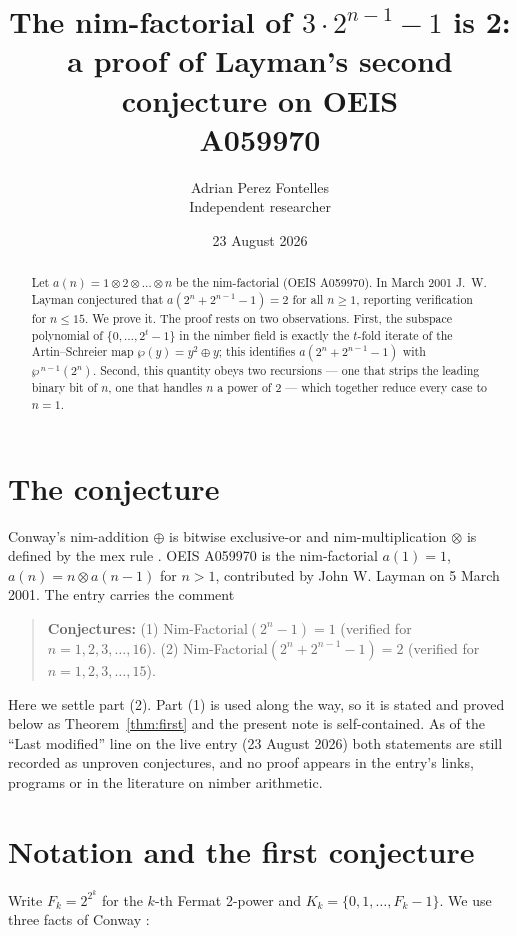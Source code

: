 \documentclass[11pt,a4paper]{article}
\title{The nim-factorial of $3\cdot2^{n-1}-1$ is 2:\\
a proof of Layman's second conjecture on OEIS\\
A059970}
\author{Adrian Perez Fontelles\\ \small Independent researcher}
\date{23 August 2026}
\theoremstyle{plain}
\theoremstyle{definition}
\begin{document}
\maketitle

\begin{abstract}
Let $a(n)=1\otimes2\otimes\dots\otimes n$ be the nim-factorial (OEIS A059970). In March
2001 J.~W. Layman conjectured that $a(2^{n}+2^{n-1}-1)=2$ for all $n\ge1$, reporting
verification for $n\le15$. We prove it. The proof rests on two observations. First, the
subspace polynomial of $\{0,\dots,2^{t}-1\}$ in the nimber field is exactly the $t$-fold
iterate of the Artin--Schreier map $\wp(y)=y^{2}\oplus y$; this identifies
$a(2^{n}+2^{n-1}-1)$ with $\wp^{\,n-1}(2^{n})$. Second, this quantity obeys two recursions
--- one that strips the leading binary bit of $n$, one that handles $n$ a power of 2 ---
which together reduce every case to $n=1$.
\end{abstract}

\section{The conjecture}

Conway's nim-addition $\oplus$ is bitwise exclusive-or and nim-multiplication $\otimes$ is
defined by the mex rule \cite[Ch.~6]{conway}. OEIS A059970 is the nim-factorial $a(1)=1$,
$a(n)=n\otimes a(n-1)$ for $n>1$, contributed by John W. Layman on 5 March 2001. The entry
carries the comment

\begin{quote}
\textbf{Conjectures:} (1) Nim-Factorial$(2^{n}-1)=1$ (verified for $n=1,2,3,\dots,16$).
(2) Nim-Factorial$(2^{n}+2^{n-1}-1)=2$ (verified for $n=1,2,3,\dots,15$).
\end{quote}

Here we settle part (2). Part (1) is used along the way, so it is stated and proved below
as Theorem~\ref{thm:first} and the present note is self-contained. As of the ``Last
modified'' line on the live entry (23 August 2026) both statements are still recorded as
unproven conjectures, and no proof appears in the entry's links, programs or in the
literature on nimber arithmetic.

\section{Notation and the first conjecture}

Write $F_{k}=2^{2^{k}}$ for the $k$-th Fermat 2-power and $K_{k}=\{0,1,\dots,F_{k}-1\}$. We
use three facts of Conway \cite[Ch.~6]{conway}:
\end{document}
